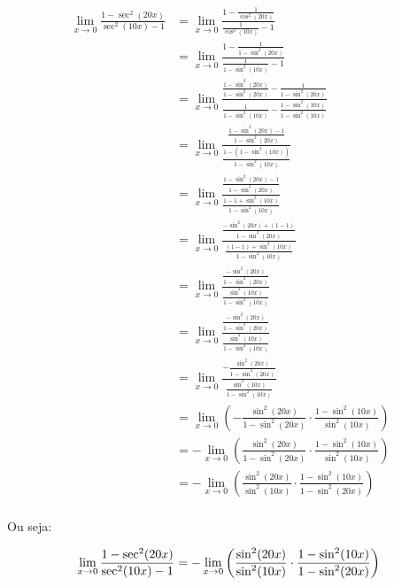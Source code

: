 \documentclass{article}
\begin{document}
\begin{align*}
    \lim_{x \to 0} \frac{1 - \sec^2(20x) }{\sec^2(10x) - 1}
     & = \lim_{x \to 0} \frac{1 - \frac{1}{\cos^2 (20x)} }{\frac{1}{\cos^2 (10x)} - 1}                                    \\
     & = \lim_{x \to 0} \frac{1 - \frac{1}{1 - \sin^2 (20x)} }{\frac{1}{1 - \sin^2 (10x)} - 1}                            \\
     & = \lim_{x \to 0} \frac{\frac{1 - \sin^2 (20x)}{1 - \sin^2 (20x)}
    - \frac{1}{1 - \sin^2 (20x)} }{\frac{1}{1 - \sin^2 (10x)} - \frac{1 - \sin^2 (10x)}{1 - \sin^2 (10x)}}                \\
     & = \lim_{x \to 0} \frac{
        \frac{1 - \sin^2 (20x) -1}{1 - \sin^2 (20x)}
    }{
        \frac{1-(1 - \sin^2 (10x))}{1 - \sin^2 (10x)}
    }
    \\
     & = \lim_{x \to 0} \frac{
        \frac{1 - \sin^2 (20x) -1}{1 - \sin^2 (20x)}
    }{
        \frac{1 - 1 + \sin^2 (10x)}{1 - \sin^2 (10x)}
    }
    \\
     & = \lim_{x \to 0} \frac{
        \frac{- \sin^2 (20x) + (1 -1)}{1 - \sin^2 (20x)}
    }{
        \frac{(1 - 1) + \sin^2 (10x)}{1 - \sin^2 (10x)}
    }
    \\
     & = \lim_{x \to 0} \frac{
        \frac{- \sin^2 (20x)}{1 - \sin^2 (20x)}
    }{
        \frac{\sin^2 (10x)}{1 - \sin^2 (10x)}
    }
    \\
     & = \lim_{x \to 0} \frac{
        \frac{- \sin^2 (20x)}{1 - \sin^2 (20x)}
    }{
        \frac{\sin^2 (10x)}{1 - \sin^2 (10x)}
    }
    \\
     & = \lim_{x \to 0} \frac{
        - \frac{ \sin^2 (20x)}{1 - \sin^2 (20x)}
    }{
        \frac{\sin^2 (10x)}{1 - \sin^2 (10x)}
    }
    \\
     & = \lim_{x \to 0} \left(- \frac{ \sin^2 (20x)}{1 - \sin^2 (20x)} \cdot \frac{1 - \sin^2 (10x)}{\sin^2 (10x)}\right) \\
     & = - \lim_{x \to 0} \left(\frac{ \sin^2 (20x)}{1 - \sin^2 (20x)} \cdot \frac{1 - \sin^2 (10x)}{\sin^2 (10x)}\right) \\
     & = - \lim_{x \to 0} \left(\frac{ \sin^2 (20x)}{\sin^2 (10x)} \cdot \frac{1 - \sin^2 (10x)}{1 - \sin^2 (20x)}\right) \\
\end{align*}

Ou seja:

\begin{equation} \label{question_3_minus_product_limit}
    \lim_{x \to 0} \frac{1 - \sec^2(20x) }{\sec^2(10x) - 1}
    = - \lim_{x \to 0} \left(\frac{ \sin^2 (20x)}{\sin^2 (10x)} \cdot \frac{1 - \sin^2 (10x)}{1 - \sin^2 (20x)}\right) \\
\end{equation}
\end{document}
